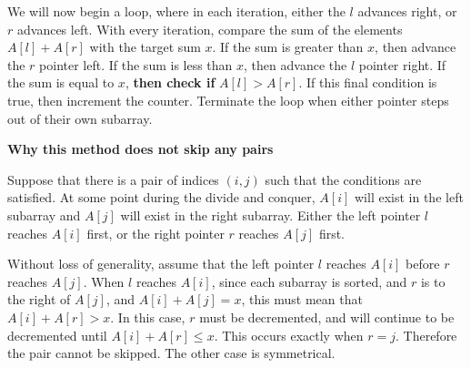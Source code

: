 \documentclass{article}
\begin{document}
\begin{solution}
\begin{center}
    
\end{center}

We will now begin a loop, where in each iteration, either the $l$ advances right, or $r$ advances left.
With every iteration, compare the sum of the elements $A[l]+A[r]$ with the target sum $x$.
If the sum is greater than $x$, then advance the $r$ pointer left. If the sum is less than $x$, then advance the $l$ pointer right.
If the sum is equal to $x$, \textbf{then check if} $A[l]>A[r]$. If this final condition is true, then increment the counter.
Terminate the loop when either pointer steps out of their own subarray.

\textbf{Why this method does not skip any pairs}

Suppose that there is a pair of indices $(i,j)$ such that the conditions are satisfied.
At some point during the divide and conquer, $A[i]$ will exist in the left subarray and $A[j]$ will exist in the right subarray.
Either the left pointer $l$ reaches $A[i]$ first, or the right pointer $r$ reaches $A[j]$ first.

Without loss of generality, assume that the left pointer $l$ reaches $A[i]$ before $r$ reaches $A[j]$.
When $l$ reaches $A[i]$, since each subarray is sorted, and $r$ is to the right of $A[j]$, and $A[i]+A[j]=x$, 
this must mean that $A[i]+A[r]>x$. In this case, $r$ must be decremented, and will continue to be decremented until $A[i] + A[r] \leq x$.
This occurs exactly when $r=j$. Therefore the pair cannot be skipped. The other case is symmetrical.


\end{solution}
\end{document}
